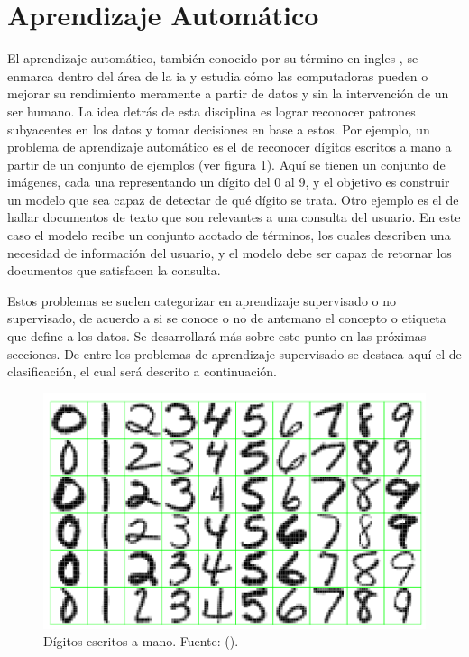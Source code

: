 \section{Aprendizaje Automático}

El aprendizaje automático, también conocido por su término en ingles
, se enmarca dentro del área de la
\acrfull{ia} y estudia cómo las computadoras pueden  o
mejorar su rendimiento meramente a partir de datos y sin la intervención de un
ser humano.  La idea detrás de esta disciplina es lograr reconocer patrones
subyacentes en los datos y tomar decisiones en base a estos. Por ejemplo, un
problema de aprendizaje automático es el de reconocer dígitos escritos a mano a
partir de un conjunto de ejemplos (ver figura \ref{fig:reconocimiento_digitos}).
Aquí se tienen un conjunto de imágenes, cada una representando un dígito del 0
al 9, y el objetivo es construir un modelo que sea capaz de detectar de qué
dígito se trata. Otro ejemplo es el de hallar documentos de texto que son
relevantes a una consulta del usuario. En este caso el modelo recibe un conjunto
acotado de términos, los cuales describen una necesidad de información del
usuario, y el modelo debe ser capaz de retornar los documentos que satisfacen la
consulta.  

Estos problemas se suelen categorizar en aprendizaje supervisado o no
supervisado, de acuerdo a si se conoce o no de antemano el concepto o etiqueta
que define a los datos. Se desarrollará más sobre este punto en las próximas
secciones. De entre los problemas de aprendizaje supervisado se destaca aquí el
de clasificación, el cual será descrito a continuación.

\begin{figure}
   \includegraphics[width=0.66\linewidth]{figures/digits_recognition_v2.png}
   \centering
   \caption{Dígitos escritos a mano. Fuente: 
   (\citeyear{hastie_elements_2009}).}
   \label{fig:reconocimiento_digitos}
\end{figure}

